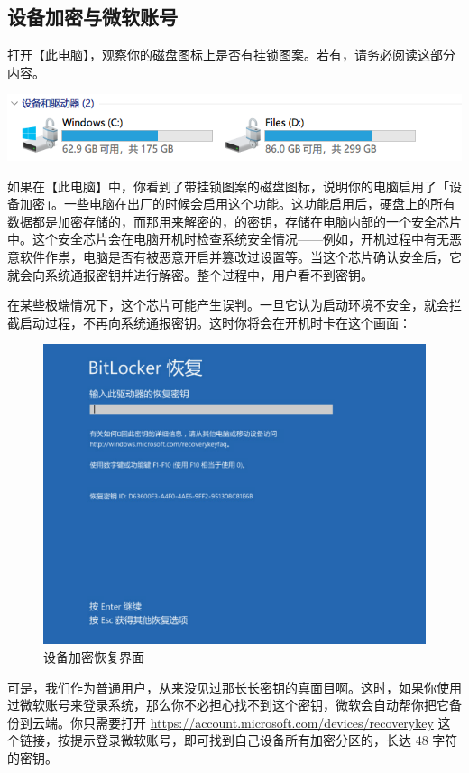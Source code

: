 {{{\subsection{设备加密与微软账号}

\begin{warning}
  打开【此电脑】，观察你的磁盘图标上是否有挂锁图案。若有，请务必阅读这部分内容。
  
  \begin{center}
    \centering
    \includegraphics[width=.8\textwidth]{assets/advanced/BitLocker.png}
    \label{fig:BitLocker}
  \end{center}
\end{warning}

如果在【此电脑】中，你看到了带挂锁图案的磁盘图标，说明你的电脑启用了「设备加密」。一些电脑在出厂的时候会启用这个功能。这功能启用后，硬盘上的所有数据都是加密存储的，而那用来解密的，的密钥，存储在电脑内部的一个安全芯片中。这个安全芯片会在电脑开机时检查系统安全情况——例如，开机过程中有无恶意软件作祟，电脑是否有被恶意开启并篡改过设置等。当这个芯片确认安全后，它就会向系统通报密钥并进行解密。整个过程中，用户看不到密钥。

在某些极端情况下，这个芯片可能产生误判。一旦它认为启动环境不安全，就会拦截启动过程，不再向系统通报密钥。这时你将会在开机时卡在这个画面：

\begin{figure}[htb!]
  \centering
  \includegraphics[width=.6\textwidth]{assets/advanced/RecoverPass.png}
  \caption{设备加密恢复界面}
  \label{fig:RecoverPass}
\end{figure}

可是，我们作为普通用户，从来没见过那长长密钥的真面目啊。这时，如果你使用过微软账号来登录系统，那么你不必担心找不到这个密钥，微软会自动帮你把它备份到云端。你只需要打开 \url{https://account.microsoft.com/devices/recoverykey} 这个链接，按提示登录微软账号，即可找到自己设备所有加密分区的，长达 48 字符的密钥。

}}}
